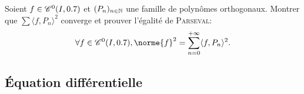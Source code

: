 \begin{exercice}    
    Soient $f \in \mathscr{C}^0(I, 0.7)$ et $(P_n)_{n \in \mathbb{N}}$ une famille de polynômes orthogonaux. Montrer que $\sum \langle f, P_n \rangle^2$ converge et prouver l'égalité de \textsc{Parseval}:
    $$\forall f \in \mathscr{C}^0(I, \R), \norme{f}^2 = \sum_{n=0}^{+ \infty} \langle f, P_n \rangle^2.$$
\end{exercice}

\begin{solution}
    
\end{solution}

\subsection{Équation différentielle}


